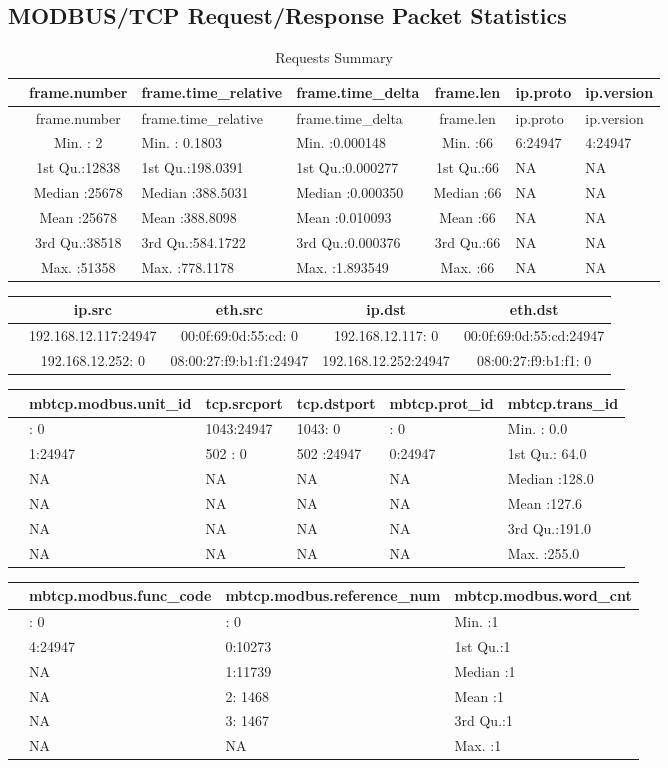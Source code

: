 \documentclass[11pt,]{article}
\begin{document}
\subsection*{MODBUS/TCP Request/Response Packet
Statistics}\label{modbustcp-requestresponse-packet-statistics}

\begin{longtable}[c]{@{}lcllcll@{}}
\caption{Requests Summary}\tabularnewline
\toprule
& frame.number & frame.time\_relative & frame.time\_delta & frame.len &
ip.proto & ip.version\tabularnewline
\midrule
\endfirsthead
\toprule
& frame.number & frame.time\_relative & frame.time\_delta & frame.len &
ip.proto & ip.version\tabularnewline
\midrule
\endhead
& Min. : 2 & Min. : 0.1803 & Min. :0.000148 & Min. :66 & 6:24947 &
4:24947\tabularnewline
& 1st Qu.:12838 & 1st Qu.:198.0391 & 1st Qu.:0.000277 & 1st Qu.:66 & NA
& NA\tabularnewline
& Median :25678 & Median :388.5031 & Median :0.000350 & Median :66 & NA
& NA\tabularnewline
& Mean :25678 & Mean :388.8098 & Mean :0.010093 & Mean :66 & NA &
NA\tabularnewline
& 3rd Qu.:38518 & 3rd Qu.:584.1722 & 3rd Qu.:0.000376 & 3rd Qu.:66 & NA
& NA\tabularnewline
& Max. :51358 & Max. :778.1178 & Max. :1.893549 & Max. :66 & NA &
NA\tabularnewline
\bottomrule
\end{longtable}

\begin{longtable}[c]{@{}lcccc@{}}
\toprule
& ip.src & eth.src & ip.dst & eth.dst\tabularnewline
\midrule
\endhead
& 192.168.12.117:24947 & 00:0f:69:0d:55:cd: 0 & 192.168.12.117: 0 &
00:0f:69:0d:55:cd:24947\tabularnewline
& 192.168.12.252: 0 & 08:00:27:f9:b1:f1:24947 & 192.168.12.252:24947 &
08:00:27:f9:b1:f1: 0\tabularnewline
\bottomrule
\end{longtable}

\begin{longtable}[c]{@{}llllll@{}}
\toprule
& mbtcp.modbus.unit\_id & tcp.srcport & tcp.dstport & mbtcp.prot\_id &
mbtcp.trans\_id\tabularnewline
\midrule
\endhead
& : 0 & 1043:24947 & 1043: 0 & : 0 & Min. : 0.0\tabularnewline
& 1:24947 & 502 : 0 & 502 :24947 & 0:24947 & 1st Qu.:
64.0\tabularnewline
& NA & NA & NA & NA & Median :128.0\tabularnewline
& NA & NA & NA & NA & Mean :127.6\tabularnewline
& NA & NA & NA & NA & 3rd Qu.:191.0\tabularnewline
& NA & NA & NA & NA & Max. :255.0\tabularnewline
\bottomrule
\end{longtable}

\begin{longtable}[c]{@{}llll@{}}
\toprule
& mbtcp.modbus.func\_code & mbtcp.modbus.reference\_num &
mbtcp.modbus.word\_cnt\tabularnewline
\midrule
\endhead
& : 0 & : 0 & Min. :1\tabularnewline
& 4:24947 & 0:10273 & 1st Qu.:1\tabularnewline
& NA & 1:11739 & Median :1\tabularnewline
& NA & 2: 1468 & Mean :1\tabularnewline
& NA & 3: 1467 & 3rd Qu.:1\tabularnewline
& NA & NA & Max. :1\tabularnewline
\bottomrule
\end{longtable}
\end{document}
